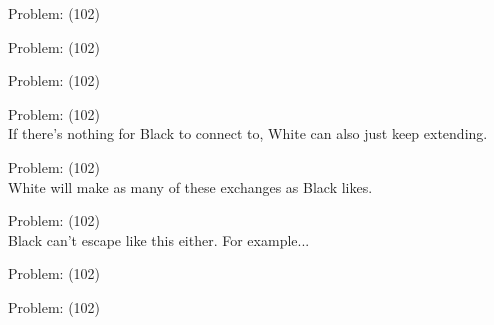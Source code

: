\documentclass[11pt]{article}
\begin{document}
\begin{minipage}[t]{0.5\textwidth}
  {\centering
  
Problem: (102)\\
  }
\end{minipage}
\begin{minipage}[t]{0.5\textwidth}
  {\centering
  
Problem: (102)\\
  }
\end{minipage}
\begin{minipage}[t]{0.5\textwidth}
  {\centering
  
Problem: (102)\\
  }
\end{minipage}
\begin{minipage}[t]{0.5\textwidth}
  {\centering
  
Problem: (102)\\
If there's nothing for Black to connect to, White can also just keep extending.\\
  }
\end{minipage}
\begin{minipage}[t]{0.5\textwidth}
  {\centering
  
Problem: (102)\\
White will make as many of these exchanges as Black likes.\\
  }
\end{minipage}
\begin{minipage}[t]{0.5\textwidth}
  {\centering
  
Problem: (102)\\
Black can't escape like this either. For example...\\
  }
\end{minipage}
\begin{minipage}[t]{0.5\textwidth}
  {\centering
  
Problem: (102)\\
  }
\end{minipage}
\begin{minipage}[t]{0.5\textwidth}
  {\centering
  
Problem: (102)\\
  }
\end{minipage}
\end{document}
